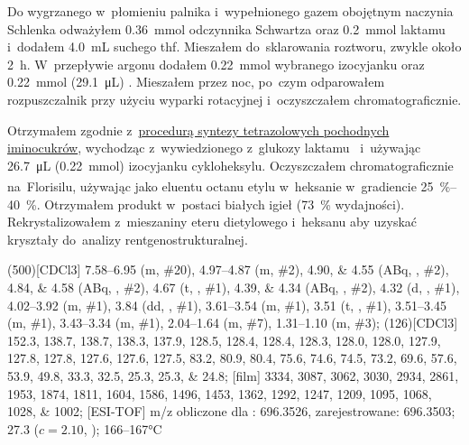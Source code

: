 Do wygrzanego w~płomieniu palnika i~wypełnionego gazem obojętnym naczynia Schlenka odważyłem
\SI{0.36}{\mmol} odczynnika Schwartza oraz \SI{0.2}{\mmol} laktamu i~dodałem \SI{4.0}{\mL} suchego \gls{thf}.
Mieszałem do~sklarowania roztworu, zwykle około \SI{2}{\hour}.
W~przepływie argonu dodałem \SI{0.22}{\mmol} wybranego izocyjanku oraz \SI{0.22}{\mmol} (\SI{29.1}{\micro\liter}) .
Mieszałem przez noc, po~czym odparowałem rozpuszczalnik przy użyciu wyparki rotacyjnej
  i~oczyszczałem chromatograficznie.

Otrzymałem zgodnie z~\hyperref[experimental:sugars:schwartz]{procedurą syntezy tetrazolowych
  pochodnych iminocukrów}, wychodząc z~wywiedzionego z~glukozy laktamu~
  i~używając \SI{26.7}{\micro\liter} (\SI{0.22}{\milli\mol}) izocyjanku cykloheksylu.
Oczyszczałem chromatograficznie na~Florisilu\textsuperscript{\textregistered},
  używając jako eluentu octanu etylu w~heksanie w~gradiencie \SIrange{25}{40}{\percent}.
Otrzymałem produkt w~postaci białych igieł (\SI{73}{\percent} wydajności).
Rekrystalizowałem z~mieszaniny eteru dietylowego i~heksanu aby uzyskać kryształy
  do~analizy rentgenostrukturalnej.

\begin{fullexp}
  \NMR(500)[CDCl3] \numrange{7.58}{6.95} (m, \#{20}), \numrange{4.97}{4.87} (m, \#{2}), \numlist{4.90;4.55} (ABq, , \#{2}), \numlist{4.84;4.58} (ABq, , \#{2}), \num{4.67} (t, , \#{1}), \numlist{4.39;4.34} (ABq, , \#{2}), \num{4.32} (d, , \#{1}), \numrange{4.02}{3.92} (m, \#{1}), \num{3.84} (dd, , \#{1}), \numrange{3.61}{3.54} (m, \#{1}), \num{3.51} (t, , \#{1}), \numrange{3.51}{3.45} (m, \#{1}), \numrange{3.43}{3.34} (m, \#{1}), \numrange{2.04}{1.64} (m, \#{7}), \numrange{1.31}{1.10} (m, \#{3});
  (126)[CDCl3] \numlist{152.3; 138.7; 138.7; 138.3; 137.9; 128.5; 128.4; 128.4; 128.3; 128.0; 128.0; 127.9; 127.8; 127.8; 127.6; 127.6; 127.5; 83.2; 80.9; 80.4; 75.6; 74.6; 74.5; 73.2; 69.6; 57.6; 53.9; 49.8; 33.3; 32.5; 25.3; 25.3; 24.8};
  [film] \numlist{3334; 3087; 3062; 3030; 2934; 2861; 1953; 1874; 1811; 1604; 1586; 1496; 1453; 1362; 1292; 1247; 1209; 1095; 1068; 1028; 1002};
  [ESI-TOF] m/z obliczone dla : \num{696.3526}, zarejestrowane: \num{696.3503};
  \data{[$\alpha^{23}_D$]~$=$} \num{27.3} ($c = 2.10$, );
   \numrange{166}{167}\si{\celsius}
\end{fullexp}

